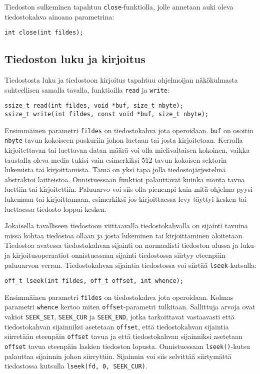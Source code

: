Tiedoston sulkeminen tapahtuu \texttt{close}-funktiolla,
jolle annetaan auki oleva tiedostokahva ainoana parametrina:

\begin{verbatim}
int close(int fildes);
\end{verbatim}

\subsection{Tiedoston luku ja kirjoitus}

Tiedostosta luku ja tiedostoon kirjoitus tapahtuu ohjelmoijan näkökulmasta suhteellisen
samalla tavalla, funktioilla \texttt{read} ja \texttt{write}:

\begin{verbatim}
ssize_t read(int fildes, void *buf, size_t nbyte);
ssize_t write(int fildes, const void *buf, size_t nbyte);
\end{verbatim}
%
Ensimmäinen parametri \texttt{fildes} on tiedostokahva jota operoidaan.
\texttt{buf} on osoitin \texttt{nbyte} tavun kokoiseen puskuriin johon
luetaan tai josta kirjoitetaan.
Kerralla kirjoitettavan tai luettavan datan määrä voi olla mielivaltaisen kokoinen,
vaikka taustalla oleva media tukisi vain esimerkiksi 512 tavun kokoisen sektorin lukemista tai kirjoittamista.
Tämä on yksi tapa jolla tiedostojärjestelmä abstraktoi laitteistoa.
Onnistuessaan funktiot palauttavat kuinka monta tavua luettiin tai kirjoitettiin.
Paluuarvo voi siis olla pienempi kuin mitä ohjelma pyysi lukemaan tai kirjoittamaan,
esimerkiksi jos kirjoittaessa levy täyttyi kesken tai luettaessa
tiedosto loppui kesken.

Jokaisella tavalliseen tiedostoon viittaavalla tiedostokahvalla on sijainti tavuina missä kohtaa tiedostoa ollaan ja josta lukeminen tai kirjoittaminen aloitetaan.
Tiedostoa avatessa tiedostokahvan sijainti on normaalisti tiedoston alussa ja luku- ja kirjoitusoperaatiot onnistuessaan sijainti tiedostossa siirtyy eteenpäin paluuarvon verran.
Tiedostokahvan sijaintia tiedostossa voi siirtää \texttt{lseek}-kutsulla:

\begin{verbatim}
off_t lseek(int fildes, off_t offset, int whence);
\end{verbatim}
Ensimmäinen parametri \texttt{fildes} on tiedostokahva jota operoidaan.
Kolmas parametri \texttt{whence} kertoo miten \texttt{offset}-parametri tulkitaan.
Sallittuja arvoja ovat vakiot \texttt{SEEK\_SET}, \texttt{SEEK\_CUR} ja \texttt{SEEK\_END},
jotka tarkoittavat vastaavasti että tiedostokahvan sijainniksi asetetaan \texttt{offset},
että tiedostokahvan sijaintia siirretään eteenpäin \texttt{offset} tavua ja
että tiedostokahvan sijainniksi asetetaan \texttt{offset} tavua eteenpäin laskien tiedoston lopusta.
Onnistuessaan \texttt{lseek()}-kutsu palauttaa sijainnin johon siirryttiin.
Sijainnin voi siis selvittää siirtymättä tiedostossa kutsulla \texttt{lseek(fd, 0, SEEK\_CUR)}.


